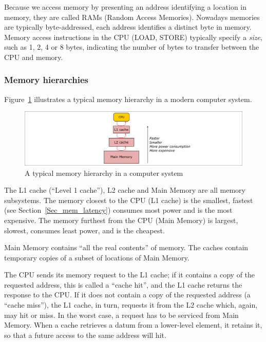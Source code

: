 
Because we access memory by presenting an address identifying a
location in memory, they are called RAMs (Random Access Memories).
Nowadays memories are typically byte-addressed, {\ie} each address
identifies a distinct byte in memory.  Memory access instructions in
the CPU (LOAD, STORE) typically specify a \emph{size}, such as 1, 2, 4
or 8 bytes, indicating the number of bytes to transfer between the CPU
and memory.


\subsubsection{Memory hierarchies}


Figure~\ref{Fig_Mem_Hierarchy} illustrates a typical memory hierarchy
in a modern computer system.
\begin{figure}[htbp]
  \centerline{\includegraphics[width=6in,angle=0]{Figures/Fig_Mem_Hierarchy}}
  \caption{\label{Fig_Mem_Hierarchy}
           A typical memory hierarchy in a computer system}
\end{figure}
The L1 cache (``Level 1 cache''), L2 cache and Main Memory are all
memory subsystems.  The memory closest to the CPU (L1 cache) is the
smallest, fastest (see Section~\ref{Sec_mem_latency}) consumes most
power and is the most expensive.  The memory furthest from the CPU
(Main Memory) is largest, slowest, consumes least power, and is the
cheapest.

Main Memory contains ``all the real contents'' of memory.  The caches
contain temporary copies of a subset of locations of Main Memory.


The CPU sends its memory request to the L1 cache; if it contains a
copy of the requested address, this is called a ``cache hit'', and the
L1 cache returns the response to the CPU.  If it does not contain a
copy of the requested address (a ``cache miss''), the L1 cache, in
turn, requests it from the L2 cache which, again, may hit or miss.  In
the worst case, a request has to be serviced from Main Memory.  When a
cache retrieves a datum from a lower-level element, it retains it, so
that a future access to the same address will hit.

